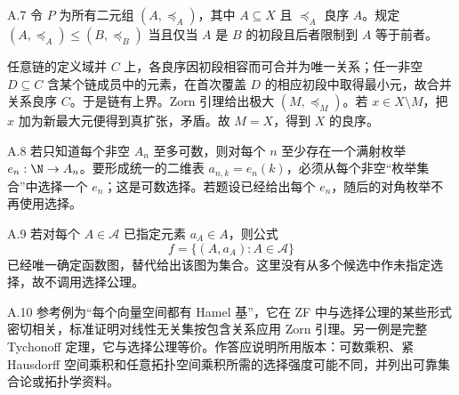 \begin{solution}{A.7}
令 \(P\) 为所有二元组 \((A,\preceq_A)\)，其中 \(A\subseteq X\) 且 \(\preceq_A\) 良序 \(A\)。规定 \((A,\preceq_A)\le(B,\preceq_B)\) 当且仅当 \(A\) 是 \(B\) 的初段且后者限制到 \(A\) 等于前者。

任意链的定义域并 \(C\) 上，各良序因初段相容而可合并为唯一关系；任一非空 \(D\subseteq C\) 含某个链成员中的元素，在首次覆盖 \(D\) 的相应初段中取得最小元，故合并关系良序 \(C\)。于是链有上界。Zorn 引理给出极大 \((M,\preceq_M)\)。若 \(x\in X\setminus M\)，把 \(x\) 加为新最大元便得到真扩张，矛盾。故 \(M=X\)，得到 \(X\) 的良序。
\end{solution}

\begin{solution}{A.8}
若只知道每个非空 \(A_n\) 至多可数，则对每个 \(n\) 至少存在一个满射枚举 \(e_n:\N\to A_n\)。要形成统一的二维表 \(a_{n,k}=e_n(k)\)，必须从每个非空“枚举集合”中选择一个 \(e_n\)；这是可数选择。若题设已经给出每个 \(e_n\)，随后的对角枚举不再使用选择。
\end{solution}

\begin{solution}{A.9}
若对每个 \(A\in\mathcal A\) 已指定元素 \(a_A\in A\)，则公式
\[
 f=\{(A,a_A):A\in\mathcal A\}
\]
已经唯一确定函数图，替代给出该图为集合。这里没有从多个候选中作未指定选择，故不调用选择公理。
\end{solution}

\begin{solution}{A.10}
参考例为“每个向量空间都有 Hamel 基”，它在 ZF 中与选择公理的某些形式密切相关，标准证明对线性无关集按包含关系应用 Zorn 引理。另一例是完整 Tychonoff 定理，它与选择公理等价。作答应说明所用版本：可数乘积、紧 Hausdorff 空间乘积和任意拓扑空间乘积所需的选择强度可能不同，并列出可靠集合论或拓扑学资料。
\end{solution}
